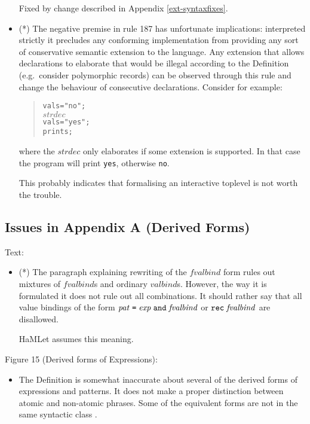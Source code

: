 \documentclass[twoside,titlepage]{article}
\begin{document}
\begin{appendix}
\begin{itemize}
Fixed by change described in Appendix \ref{ext-syntaxfixes}.

\item (*) The negative premise in rule 187 has unfortunate implications: interpreted strictly it precludes any conforming implementation from providing any sort of conservative semantic extension to the language. Any extension that allows declarations to elaborate that would be illegal according to the Definition (e.g.\ consider polymorphic records) can be observed through this rule and change the behaviour of consecutive declarations. Consider for example:

\begin{quote}
\begin{alltt}
val s = "no";
\(\mathit{strdec}\)
val s = "yes";
print s;
\end{alltt}
\end{quote}

where the $\mathit{strdec}$ only elaborates if some extension is supported. In that case the program will print {\tt yes}, otherwise {\tt no}.

This probably indicates that formalising an interactive toplevel is not worth the trouble.
\end{itemize}


\subsection{Issues in Appendix A (Derived Forms)}
\label{bugsappendixa}

Text:

\begin{itemize}
\item (*) The paragraph explaining rewriting of the $\mathit{fvalbind}$ form rules out mixtures of $\mathit{fvalbind}$s and ordinary $\mathit{valbind}$s. However, the way it is formulated it does not rule out all combinations. It should rather say that all value bindings of the form $\mathit{pat}\;\mbox{\tt=}\;\mathit{exp}\;{\tt and}\;\mathit{fvalbind}$ or ${\tt rec}\;\mathit{fvalbind}$ are disallowed.

HaMLet assumes this meaning.
\end{itemize}

Figure 15 (Derived forms of Expressions):

\begin{itemize}
\item The Definition is somewhat inaccurate about several of the derived forms of expressions and patterns. It does not make a proper distinction between atomic and non-atomic phrases. Some of the equivalent forms are not in the same syntactic class \cite{commentary, mistakes}.


\end{itemize}
\end{appendix}
\end{document}
